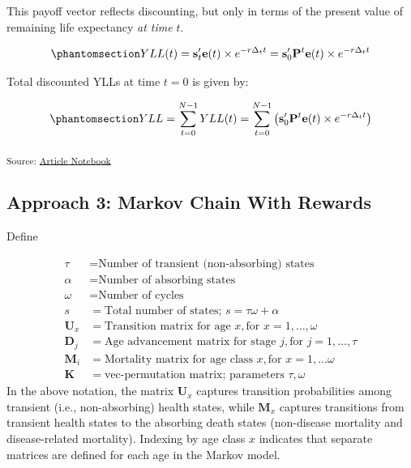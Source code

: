 \documentclass[
]{agujournal2019}
\begin{document}
This payoff vector reflects discounting, but only in terms of the
present value of remaining life expectancy \emph{at time} \(t\).

\begin{equation}\phantomsection\label{eq-yllt}{
YLL(t)=\mathbf{s}'_t \mathbf{e}(t)  \times{e^{-r\Delta_t t}} =\mathbf{s}'_0 \mathbf{P}^t \mathbf{e}(t)  \times{e^{-r\Delta_t t}}
}\end{equation}

Total discounted YLLs at time \(t=0\) is given by:

\begin{equation}\phantomsection\label{eq-yllcum}{
YLL=\sum_{t=0}^{N-1} YLL(t) =\sum_{t=0}^{N-1}\left(\mathbf{s}'_0 \mathbf{P}^t \mathbf{e}(t)  \times{e^{-r\Delta_t t}} \right) 
}\end{equation}

\textsubscript{Source:
\href{https://graveja0.github.io/dalys/index.qmd.html}{Article
Notebook}}

\subsection{Approach 3: Markov Chain With
Rewards}\label{approach-3-markov-chain-with-rewards}

Define

\[
\begin{aligned}
\tau &= \text{Number of transient (non-absorbing) states}\\
\alpha &= \text{Number of absorbing states}\\
\omega &= \text{Number of cycles} \\
s &= \text{Total number of states; }s=\tau\omega+\alpha \\
\mathbf{U}_{x} &= \text{Transition matrix for age }x, \text{for }x=1,\dots,\omega\\
\mathbf{D}_{j} &=\text{Age advancement matrix for stage }j, \text{for }j=1,\dots,\tau \\
\mathbf{M}_{i} &= \text{Mortality matrix for age class }x, \text{for } x = 1,\dots\omega \\
\mathbf{K} &= \text{vec-permutation matrix; parameters }\tau,\omega
\end{aligned}
\] In the above notation, the matrix \(\mathbf{U}_x\) captures
transition probabilities among transient (i.e., non-absorbing) health
states, while \(\mathbf{M}_x\) captures transitions from transient
health states to the absorbing death states (non-disease mortality and
disease-related mortality). Indexing by age class \(x\) indicates that
separate matrices are defined for each age in the Markov model.
\end{document}

